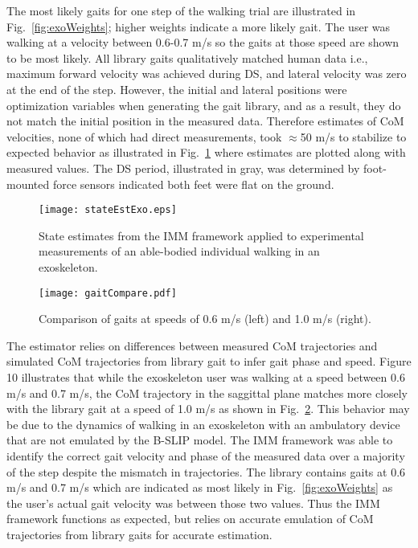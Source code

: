 The most likely gaits for one step of the walking trial are illustrated in Fig.~\ref{fig:exoWeights}; higher weights indicate a more likely gait. The user was walking at a velocity between 0.6-0.7 m/s so the gaits at those speed are shown to be most likely. All library gaits qualitatively matched human data i.e., maximum forward velocity was achieved during DS, and lateral velocity was zero at the end of the step. However, the initial and lateral positions were optimization variables when generating the gait library, and as a result, they do not match the initial position in the measured data. Therefore estimates of CoM velocities, none of which had direct measurements, took $ \approx $50 m/s to stabilize to expected behavior as illustrated in Fig.~\ref{fig:exoState} where estimates are plotted along with measured values. The DS period, illustrated in gray, was determined by foot-mounted force sensors indicated both feet were flat on the ground.
\begin{figure}
	\centering
	\texttt{[image: stateEstExo.eps]}
	\caption{State estimates from the IMM framework applied to experimental measurements of an able-bodied individual walking in an exoskeleton.}\label{fig:exoState}
\end{figure}

\begin{figure}
	\centering
	\texttt{[image: gaitCompare.pdf]}
	\caption{Comparison of gaits at speeds of 0.6 m/s  (left) and 1.0 m/s  (right).}\label{fig:compare}
\end{figure}

The estimator relies on differences between measured CoM trajectories and simulated CoM trajectories from library gait to infer gait phase and speed. Figure 10 illustrates that while the exoskeleton user was walking at a speed between 0.6 m/s and 0.7 m/s, the CoM trajectory in the saggittal plane matches more closely with the library gait at a speed of 1.0 m/s as shown in Fig.~\ref{fig:compare}. This behavior may be due to the dynamics of walking in an exoskeleton with an ambulatory device that are not emulated by the B-SLIP model. The IMM framework was able to identify the correct gait velocity and phase of the measured data over a majority of the step despite the mismatch in trajectories. The library contains gaits at 0.6 m/s and 0.7 m/s which are indicated as most likely in Fig.~\ref{fig:exoWeights} as the user's actual gait velocity was between those two values. Thus the IMM framework functions as expected, but relies on accurate emulation of CoM trajectories from library gaits for accurate estimation.

